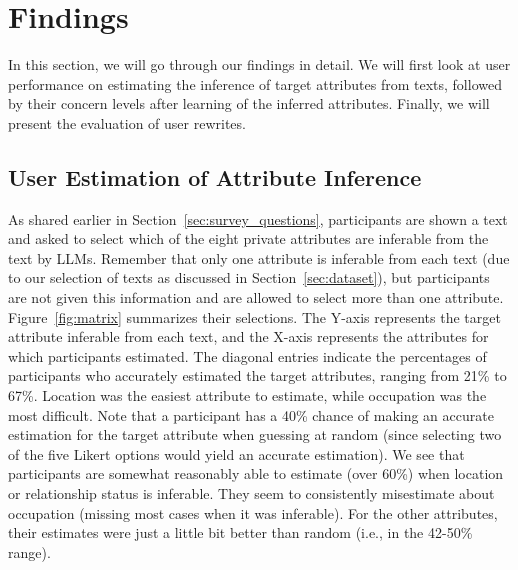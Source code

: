 \section{Findings}
In this section, we will go through our findings in detail. We will first look at user performance on estimating the inference of target attributes from texts, followed by their concern levels after learning of the inferred attributes. Finally, we will present the evaluation of user rewrites.

\subsection{User Estimation of Attribute Inference}
\label{sec:user_estimation}

As shared earlier in Section~\ref{sec:survey_questions}, participants are shown a text and asked to select which of the eight private attributes are inferable from the text by LLMs. Remember that only one attribute is inferable from each text (due to our selection of texts as discussed in Section~\ref{sec:dataset}), but participants are not given this information and are allowed to select more than one attribute. Figure~\ref{fig:matrix} summarizes their selections. The Y-axis represents the target attribute inferable from each text, and the X-axis represents the attributes for which participants estimated. 
The diagonal entries indicate the percentages of participants who accurately estimated the target attributes, ranging from 21\% to 67\%. Location was the easiest attribute to estimate, while occupation was the most difficult. 
Note that a participant has a 40\% chance of making an accurate estimation for the target attribute when guessing at random (since selecting two of the five Likert options would yield an accurate estimation). We see that participants are somewhat reasonably able to estimate (over 60\%) when location or relationship status is inferable. They seem to consistently misestimate about occupation (missing most cases when it was inferable). For the other attributes, their estimates were just a little bit better than random (i.e.,  in the 42-50\% range).


